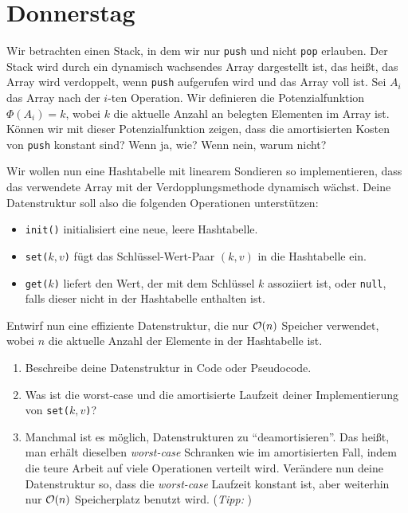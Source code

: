 \documentclass{uebung_cs}
\begin{document}
\section*{Donnerstag}
\begin{exercise}
    Wir betrachten einen Stack, in dem wir nur \texttt{push} und nicht \texttt{pop} erlauben. Der Stack wird durch ein dynamisch wachsendes Array dargestellt ist, das heißt, das Array wird verdoppelt, wenn \texttt{push} aufgerufen wird und das Array voll ist.
    Sei $A_i$ das Array nach der $i$-ten Operation.
    Wir definieren die Potenzialfunktion $\Phi(A_i) = k$, wobei $k$ die aktuelle Anzahl an belegten Elementen im Array ist.
    Können wir mit dieser Potenzialfunktion zeigen, dass die amortisierten Kosten von \texttt{push} konstant sind? Wenn ja, wie? Wenn nein, warum nicht?
\end{exercise}

\begin{exercise}
    Wir wollen nun eine Hashtabelle mit linearem Sondieren so implementieren, dass das verwendete Array mit der Verdopplungsmethode dynamisch wächst.
    Deine Datenstruktur soll also die folgenden Operationen unterstützen:
    \begin{itemize}
        \item \texttt{init()} initialisiert eine neue, leere Hashtabelle.
        \item \texttt{set($k,v$)} fügt das Schlüssel-Wert-Paar $(k,v)$ in die Hashtabelle ein.
        \item \texttt{get($k$)} liefert den Wert, der mit dem Schlüssel $k$ assoziiert ist, oder \texttt{null}, falls dieser nicht in der Hashtabelle enthalten ist.
    \end{itemize}
    Entwirf nun eine effiziente Datenstruktur, die nur $\mathcal{O}(n)$ Speicher verwendet, wobei $n$ die aktuelle Anzahl der Elemente in der Hashtabelle ist.
    \begin{enumerate}
        \item\athome Beschreibe deine Datenstruktur in Code oder Pseudocode.
        \item\athome Was ist die worst-case und die amortisierte Laufzeit deiner Implementierung von \texttt{set($k,v$)}?
        \item\atschool\note Manchmal ist es möglich, Datenstrukturen zu \enquote{deamortisieren}. Das heißt, man erhält dieselben \emph{worst-case} Schranken wie im amortisierten Fall, indem die teure Arbeit auf viele Operationen verteilt wird.
        Verändere nun deine Datenstruktur so, dass die \emph{worst-case} Laufzeit konstant ist, aber weiterhin nur $\mathcal{O}(n)$ Speicherplatz benutzt wird.
        (\emph{Tipp: })
    \end{enumerate}
\end{exercise}%
%
\end{document}
